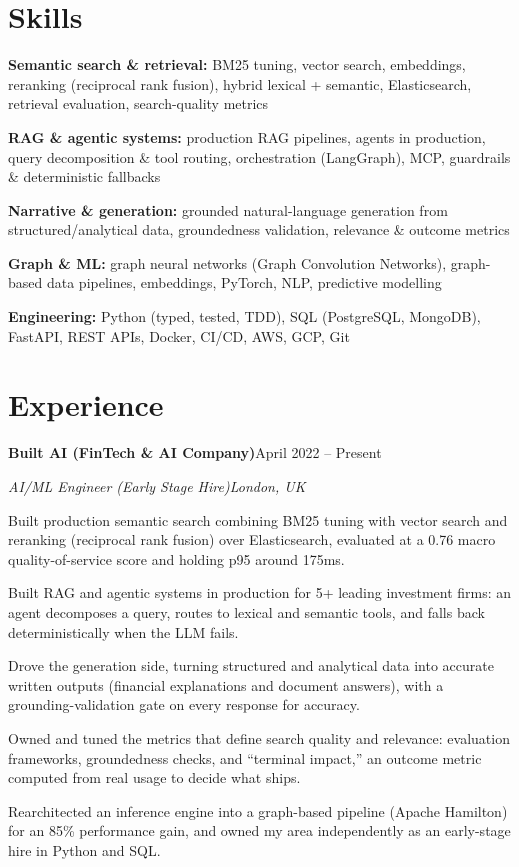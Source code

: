 \documentclass[10pt,a4paper]{article}
\newcommand{\entry}[4]{%
  {\color{company}\bfseries #1}\hfill {\color{muted}#2}\par
  \vspace{1pt}
  {\itshape #3}\hfill {\color{muted}\itshape #4}\par
  \vspace{3pt}%
}
\begin{document}
\section{Skills}
\begin{tight}
  \item[\textcolor{accent}{\small$\bullet$}] \textbf{Semantic search \& retrieval:} BM25 tuning, vector search, embeddings, reranking (reciprocal rank fusion), hybrid lexical + semantic, Elasticsearch, retrieval evaluation, search-quality metrics
  \item[\textcolor{accent}{\small$\bullet$}] \textbf{RAG \& agentic systems:} production RAG pipelines, agents in production, query decomposition \& tool routing, orchestration (LangGraph), MCP, guardrails \& deterministic fallbacks
  \item[\textcolor{accent}{\small$\bullet$}] \textbf{Narrative \& generation:} grounded natural-language generation from structured/analytical data, groundedness validation, relevance \& outcome metrics
  \item[\textcolor{accent}{\small$\bullet$}] \textbf{Graph \& ML:} graph neural networks (Graph Convolution Networks), graph-based data pipelines, embeddings, PyTorch, NLP, predictive modelling
  \item[\textcolor{accent}{\small$\bullet$}] \textbf{Engineering:} Python (typed, tested, TDD), SQL (PostgreSQL, MongoDB), FastAPI, REST APIs, Docker, CI/CD, AWS, GCP, Git
\end{tight}

\section{Experience}
\entry{Built AI (FinTech \& AI Company)}{April 2022 -- Present}{AI/ML Engineer (Early Stage Hire)}{London, UK}
\begin{tight}
  \item Built production semantic search combining BM25 tuning with vector search and reranking (reciprocal rank fusion) over Elasticsearch, evaluated at a 0.76 macro quality-of-service score and holding p95 around 175ms.
  \item Built RAG and agentic systems in production for 5+ leading investment firms: an agent decomposes a query, routes to lexical and semantic tools, and falls back deterministically when the LLM fails.
  \item Drove the generation side, turning structured and analytical data into accurate written outputs (financial explanations and document answers), with a grounding-validation gate on every response for accuracy.
  \item Owned and tuned the metrics that define search quality and relevance: evaluation frameworks, groundedness checks, and ``terminal impact,'' an outcome metric computed from real usage to decide what ships.
  \item Rearchitected an inference engine into a graph-based pipeline (Apache Hamilton) for an 85\% performance gain, and owned my area independently as an early-stage hire in Python and SQL.
\end{tight}
\end{document}
